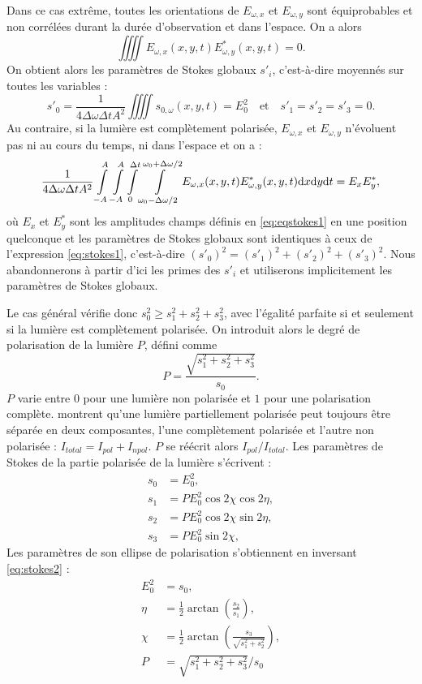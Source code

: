 Dans ce cas extrême, toutes les orientations de $E_{\omega,x}$ et $E_{\omega,y}$ sont équiprobables et non corrélées durant la durée d'observation et dans l'espace. On a alors
\begin{equation}
\iiiint{E_{\omega,x}(x,y,t) E^*_{\omega,y}(x,y,t)} = 0.
\end{equation}
On obtient alors les paramètres de Stokes globaux $s'_i$, c'est-à-dire moyennés sur toutes les variables :
\begin{equation}
s'_0=\frac{1}{4\Delta\omega\Delta t A^2}\iiiint{s_{0,\omega}(x,y,t)} = E_0^2 \quad\text{et}\quad s'_1=s'_2=s'_3=0.
\end{equation}
Au contraire, si la lumière est complètement polarisée, $E_{\omega,x}$ et $E_{\omega,y}$ n'évoluent pas ni au cours du temps, ni dans l'espace et on a :
\begin{equation}
\frac{1}{4\Delta\omega\Delta t A^2}\int\limits_{-A}^A\int\limits_{-A}^A\int\limits_0^{\Delta t}\int\limits_{\omega_0-\Delta\omega/2}^{\omega_0+\Delta\omega/2}{E_{\omega,x}(x,y,t) E^*_{\omega,y}(x,y,t)\mathrm{d} x\mathrm{d} y\mathrm{d} t} = E_x E^*_y,
\end{equation}
où $E_x$ et $E^*_y$ sont les amplitudes champs définis en \ref{eq:eqstokes1} en une position quelconque et les paramètres de Stokes globaux sont identiques à ceux de l'expression \ref{eq:stokes1}, c'est-à-dire $(s'_0)^2 = (s'_1)^2+(s'_2)^2+(s'_3)^2$. Nous abandonnerons à partir d'ici les primes des $s'_i$ et utiliserons implicitement les paramètres de Stokes globaux. 

Le cas général vérifie donc $s_0^2 \geq s_1^2+s_2^2+s_3^2$, avec l'égalité parfaite si et seulement si la lumière est complètement polarisée. On introduit alors le degré de polarisation de la lumière $P$, défini comme 
\begin{equation}
P = \frac{\sqrt{s_1^2+s_2^2+s_3^2}}{s_0}.
\end{equation}
$P$ varie entre $0$ pour une lumière non polarisée et $1$ pour une polarisation complète.  montrent qu'une lumière partiellement polarisée peut toujours être séparée en deux composantes, l'une complètement polarisée et l'autre non polarisée : $I_{total} = I_{pol} + I_{npol}$. $P$ se réécrit alors $I_{pol}/I_{total}$. Les paramètres de Stokes de la partie polarisée de la lumière s'écrivent :
\begin{align}
s_0 &= E_0^2,\nonumber\\
s_1 &= PE_0^2\cos 2\chi\cos 2\eta ,\nonumber\\
s_2 &= PE_0^2\cos 2\chi\sin 2\eta,\nonumber\\
s_3 &= PE_0^2\sin 2\chi,	
\label{eq:stokes2}
\end{align}
Les paramètres de son ellipse de polarisation s'obtiennent en inversant \ref{eq:stokes2} :
\begin{align}
E_0^2 &= s_0,\nonumber\\
\eta &= \frac{1}{2} \arctan\left(\frac{s_2}{s_1}\right),\nonumber\\
\chi &= \frac{1}{2} \arctan\left(\frac{s_3}{\sqrt{s_1^2+s_2^2}}\right),\nonumber\\
P &= \sqrt{s_1^2+s_2^2+s_3^2}/s_0
\label{eq:stokes2inv}
\end{align}

